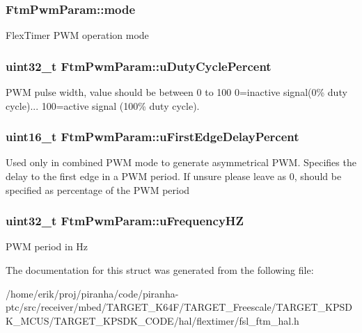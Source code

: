 \subsubsection[{\texorpdfstring{mode}{mode}}]{ Ftm\+Pwm\+Param\+::mode}\hypertarget{structFtmPwmParam_a8ea0c02d8ce13209f06c98a707a5037f}{}\label{structFtmPwmParam_a8ea0c02d8ce13209f06c98a707a5037f}
Flex\+Timer P\+WM operation mode 
\subsubsection[{\texorpdfstring{u\+Duty\+Cycle\+Percent}{uDutyCyclePercent}}]{\setlength{\rightskip}{0pt plus 5cm}uint32\+\_\+t Ftm\+Pwm\+Param\+::u\+Duty\+Cycle\+Percent}\hypertarget{structFtmPwmParam_a0ce2cb93a84dade11458809e303716c3}{}\label{structFtmPwmParam_a0ce2cb93a84dade11458809e303716c3}
P\+WM pulse width, value should be between 0 to 100 0=inactive signal(0\% duty cycle)... 100=active signal (100\% duty cycle). 
\subsubsection[{\texorpdfstring{u\+First\+Edge\+Delay\+Percent}{uFirstEdgeDelayPercent}}]{\setlength{\rightskip}{0pt plus 5cm}uint16\+\_\+t Ftm\+Pwm\+Param\+::u\+First\+Edge\+Delay\+Percent}\hypertarget{structFtmPwmParam_a67950ed56a49a0e41fdd7f9f5124ea9c}{}\label{structFtmPwmParam_a67950ed56a49a0e41fdd7f9f5124ea9c}
Used only in combined P\+WM mode to generate asymmetrical P\+WM. Specifies the delay to the first edge in a P\+WM period. If unsure please leave as 0, should be specified as percentage of the P\+WM period 
\subsubsection[{\texorpdfstring{u\+Frequency\+HZ}{uFrequencyHZ}}]{\setlength{\rightskip}{0pt plus 5cm}uint32\+\_\+t Ftm\+Pwm\+Param\+::u\+Frequency\+HZ}\hypertarget{structFtmPwmParam_ad165194b75959ee61877a6169c6e895b}{}\label{structFtmPwmParam_ad165194b75959ee61877a6169c6e895b}
P\+WM period in Hz 

The documentation for this struct was generated from the following file\+:\begin{DoxyCompactItemize}
\item 
/home/erik/proj/piranha/code/piranha-\/ptc/src/receiver/mbed/\+T\+A\+R\+G\+E\+T\+\_\+\+K64\+F/\+T\+A\+R\+G\+E\+T\+\_\+\+Freescale/\+T\+A\+R\+G\+E\+T\+\_\+\+K\+P\+S\+D\+K\+\_\+\+M\+C\+U\+S/\+T\+A\+R\+G\+E\+T\+\_\+\+K\+P\+S\+D\+K\+\_\+\+C\+O\+D\+E/hal/flextimer/fsl\+\_\+ftm\+\_\+hal.\+h\end{DoxyCompactItemize}
